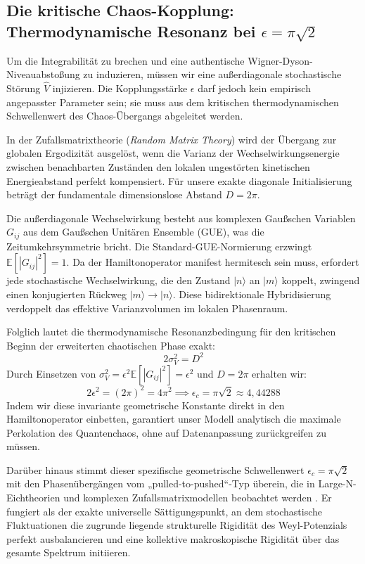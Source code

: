 \documentclass[aps,prl,preprint,superscriptaddress,floatfix]{revtex4-2}
\begin{document}
\subsection{Die kritische Chaos-Kopplung: Thermodynamische Resonanz bei \texorpdfstring{$\epsilon = \pi \sqrt{2}$}{epsilon = pi sqrt(2)}}

Um die Integrabilität zu brechen und eine authentische Wigner-Dyson-Niveauabstoßung zu induzieren, müssen wir eine außerdiagonale stochastische Störung $\hat{V}$ injizieren. Die Kopplungsstärke $\epsilon$ darf jedoch kein empirisch angepasster Parameter sein; sie muss aus dem kritischen thermodynamischen Schwellenwert des Chaos-Übergangs abgeleitet werden.

In der Zufallsmatrixtheorie (\textit{Random Matrix Theory}) wird der Übergang zur globalen Ergodizität ausgelöst, wenn die Varianz der Wechselwirkungsenergie zwischen benachbarten Zuständen den lokalen ungestörten kinetischen Energieabstand perfekt kompensiert. Für unsere exakte diagonale Initialisierung beträgt der fundamentale dimensionslose Abstand $D = 2\pi$.

Die außerdiagonale Wechselwirkung besteht aus komplexen Gaußschen Variablen $G_{ij}$ aus dem Gaußschen Unitären Ensemble (GUE), was die Zeitumkehrsymmetrie bricht. Die Standard-GUE-Normierung erzwingt $\mathbb{E}[|G_{ij}|^2] = 1$. Da der Hamiltonoperator manifest hermitesch sein muss, erfordert jede stochastische Wechselwirkung, die den Zustand $|n\rangle$ an $|m\rangle$ koppelt, zwingend einen konjugierten Rückweg $|m\rangle \to |n\rangle$. Diese bidirektionale Hybridisierung verdoppelt das effektive Varianzvolumen im lokalen Phasenraum. 

Folglich lautet die thermodynamische Resonanzbedingung für den kritischen Beginn der erweiterten chaotischen Phase exakt:
\begin{equation}
2 \sigma_V^2 = D^2
\end{equation}
Durch Einsetzen von $\sigma_V^2 = \epsilon^2 \mathbb{E}[|G_{ij}|^2] = \epsilon^2$ und $D = 2\pi$ erhalten wir:
\begin{equation}
2 \epsilon^2 = (2\pi)^2 = 4\pi^2 \implies \boxed{ \epsilon_c = \pi \sqrt{2} \approx 4,44288 }
\end{equation}
Indem wir diese invariante geometrische Konstante direkt in den Hamiltonoperator einbetten, garantiert unser Modell analytisch die maximale Perkolation des Quantenchaos, ohne auf Datenanpassung zurückgreifen zu müssen.

Darüber hinaus stimmt dieser spezifische geometrische Schwellenwert $\epsilon_c = \pi\sqrt{2}$ mit den Phasenübergängen vom „pulled-to-pushed“-Typ überein, die in Large-N-Eichtheorien und komplexen Zufallsmatrixmodellen beobachtet werden \cite{Gross1980, Cunden2018}. Er fungiert als der exakte universelle Sättigungspunkt, an dem stochastische Fluktuationen die zugrunde liegende strukturelle Rigidität des Weyl-Potenzials perfekt ausbalancieren und eine kollektive makroskopische Rigidität über das gesamte Spektrum initiieren.
\end{document}
